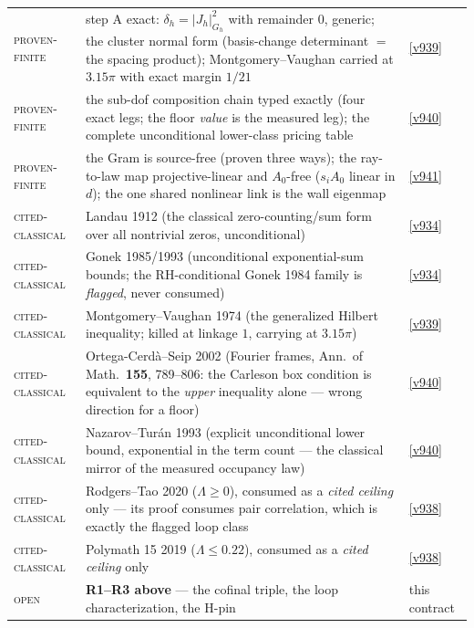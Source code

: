\begin{center}
\begin{tabularx}{\linewidth}{@{}l>{\hsize=1.45\hsize\raggedright\arraybackslash}X>{\hsize=0.55\hsize\raggedright\arraybackslash}X@{}}
\textsc{proven-finite} & step A exact: $\delta_h = |J_h|^2_{G_h}$ with remainder $0$, generic; the cluster normal form (basis-change determinant $=$ the spacing product); Montgomery--Vaughan carried at $3.15\pi$ with exact margin $1/21$ & \vref{v939} \\
\textsc{proven-finite} & the sub-dof composition chain typed exactly (four exact legs; the floor \emph{value} is the measured leg); the complete unconditional lower-class pricing table & \vref{v940} \\
\textsc{proven-finite} & the Gram is source-free (proven three ways); the ray-to-law map projective-linear and $A_0$-free ($s_i A_0$ linear in $d$); the one shared nonlinear link is the wall eigenmap & \vref{v941} \\
\textsc{cited-classical} & Landau 1912 (the classical zero-counting/sum form over all nontrivial zeros, unconditional) & \vref{v934} \\
\textsc{cited-classical} & Gonek 1985/1993 (unconditional exponential-sum bounds; the RH-conditional Gonek 1984 family is \emph{flagged}, never consumed) & \vref{v934} \\
\textsc{cited-classical} & Montgomery--Vaughan 1974 (the generalized Hilbert inequality; killed at linkage $1$, carrying at $3.15\pi$) & \vref{v939} \\
\textsc{cited-classical} & Ortega-Cerd\`a--Seip 2002 (Fourier frames, Ann.\ of Math.\ \textbf{155}, 789--806: the Carleson box condition is equivalent to the \emph{upper} inequality alone --- wrong direction for a floor) & \vref{v940} \\
\textsc{cited-classical} & Nazarov--Tur\'an 1993 (explicit unconditional lower bound, exponential in the term count --- the classical mirror of the measured occupancy law) & \vref{v940} \\
\textsc{cited-classical} & Rodgers--Tao 2020 ($\Lambda \ge 0$), consumed as a \emph{cited ceiling} only --- its proof consumes pair correlation, which is exactly the flagged loop class & \vref{v938} \\
\textsc{cited-classical} & Polymath 15 2019 ($\Lambda \le 0.22$), consumed as a \emph{cited ceiling} only & \vref{v938} \\
\textsc{open} & \textbf{R1--R3 above} --- the cofinal triple, the loop characterization, the H-pin & this contract \\
\bottomrule
\end{tabularx}
\end{center}


